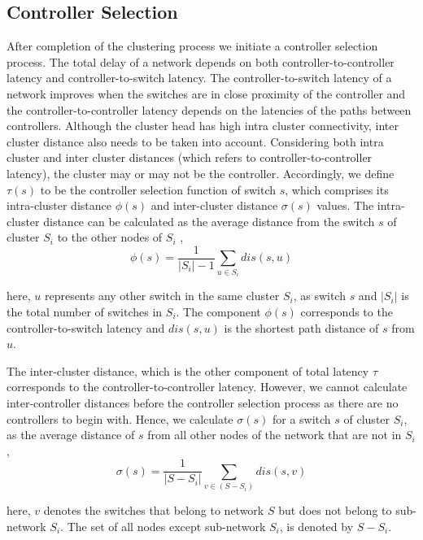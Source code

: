 \documentclass{IEEEtran}
\begin{document}
	\subsection{Controller Selection}
	After completion of the clustering process we initiate a controller selection process. The total delay of a network depends on both controller-to-controller latency and controller-to-switch latency. The controller-to-switch latency of a network improves when the switches are in close proximity of the controller and the controller-to-controller latency depends on the latencies of the paths between controllers. Although the cluster head has high intra cluster connectivity, inter cluster distance also needs to be taken into account. Considering both intra cluster and inter cluster distances (which refers to controller-to-controller latency), the cluster may or may not be the controller. Accordingly, we define $\tau(s)$ to be the controller selection function of switch $s$, which comprises its intra-cluster distance $\phi(s)$ and inter-cluster distance $\sigma(s)$ values. The intra-cluster distance can be calculated as the average distance from the switch $s$ of cluster $S_i$ to the other nodes of $S_i$ \cite{dbcp2017},
	\begin{equation} \label{eqn:intra}
	\phi(s) = \frac{1}{|S_i|-1}\sum_{u\in S_i} dis(s,u)
	\end{equation}
	
	here, $u$ represents any other switch in the same cluster $S_i$, as switch $s$ and $|S_i|$ is the total number of switches in $S_i$. The component $\phi(s)$ corresponds to the controller-to-switch latency and $dis(s,u)$ is the shortest path distance of $s$ from $u$.
	
	The inter-cluster distance, which is the other component of total latency $\tau$ corresponds to the controller-to-controller latency. However, we cannot calculate inter-controller distances before the controller selection process as there are no controllers to begin with. Hence, we calculate $\sigma(s)$ for a switch $s$ of cluster $S_i$, as the average distance of $s$ from all other nodes of the network that are not in $S_i$ \cite{dbcp2017},
	\begin{equation} \label{eqn:inter}
	\sigma(s) = \frac{1}{|S-S_i|}\sum_{v\in (S-S_i)} dis(s,v)
	\end{equation}
	
	here, $v$ denotes the switches that belong to  network $S$ but does not belong to sub-network $S_i$. The set of all nodes except sub-network $S_i$, is denoted by $S-S_i$.
	
\end{document}
